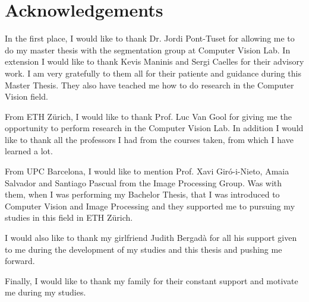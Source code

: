
\chapter*{Acknowledgements}
\label{cha:ack}

In the first place, I would like to thank Dr. Jordi Pont-Tuset for allowing me to do my master thesis with the segmentation group at Computer Vision Lab. 
In extension I would like to thank Kevis Maninis and Sergi Caelles for their advisory work. 
I am very gratefully to them all for their patiente and guidance during this Master Thesis. 
They also have teached me how to do research in the Computer Vision field.

From ETH Z\"urich, I would like to thank Prof. Luc Van Gool for giving me the opportunity to perform research in the Computer Vision Lab.
In addition I would like to thank all the professors I had from the courses taken, from which I have learned a lot.

From UPC Barcelona, I would like to mention Prof. Xavi Gir\'o-i-Nieto, Amaia Salvador and Santiago Pascual from the Image Processing Group. 
Was with them, when I was performing my Bachelor Thesis, that I was introduced to Computer Vision and Image Processing and they supported me to pursuing my studies in this field in ETH Z\"urich.

I would also like to thank my girlfriend Judith Bergad\`a for all his support given to me during the development of my studies and this thesis and pushing me forward.

Finally, I would like to thank my family for their constant support and motivate me during my studies. 
